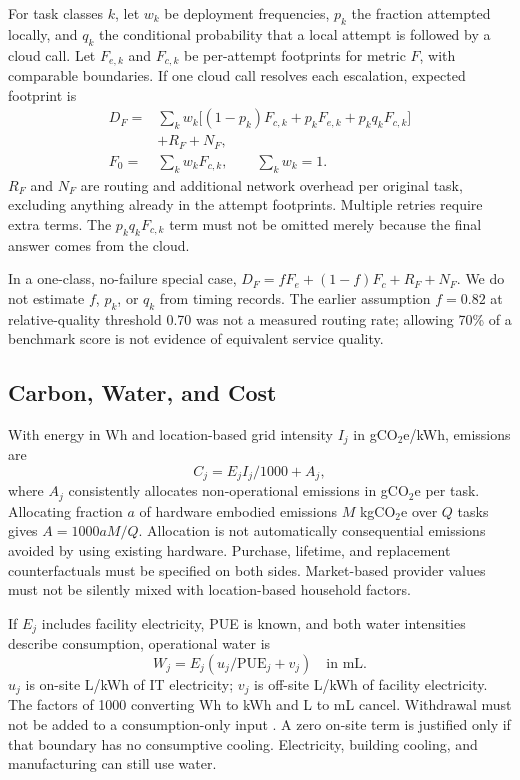 \documentclass[conference]{IEEEtran}
\begin{document}
For task classes $k$, let $w_k$ be deployment frequencies, $p_k$ the
fraction attempted locally, and $q_k$ the conditional probability that a
local attempt is followed by a cloud call. Let $F_{e,k}$ and $F_{c,k}$
be per-attempt footprints for metric $F$, with comparable boundaries.
If one cloud call resolves each escalation, expected footprint is
\begin{align}
D_F={}&\sum_k w_k\big[(1-p_k)F_{c,k}
+p_kF_{e,k}+p_kq_kF_{c,k}\big]\nonumber\\
&+R_F+N_F, \label{eq:routing}\\
F_0={}&\sum_k w_kF_{c,k},\qquad \sum_k w_k=1. \label{eq:baseline}
\end{align}
$R_F$ and $N_F$ are routing and additional network overhead per original
task, excluding anything already in the attempt footprints.
Multiple retries require extra terms. The $p_kq_kF_{c,k}$ term must not
be omitted merely because the final answer comes from the cloud.

In a one-class, no-failure special case,
$D_F=fF_e+(1-f)F_c+R_F+N_F$.
We do not estimate $f$, $p_k$, or $q_k$ from timing records.
The earlier assumption $f=0.82$ at relative-quality threshold 0.70 was
not a measured routing rate; allowing 70\% of a benchmark score is not
evidence of equivalent service quality.

\subsection{Carbon, Water, and Cost}
With energy in Wh and location-based grid intensity $I_j$ in
gCO$_2$e/kWh, emissions are
\begin{equation}
C_j=E_jI_j/1000+A_j, \label{eq:carbon}
\end{equation}
where $A_j$ consistently allocates non-operational emissions in
gCO$_2$e per task. Allocating fraction $a$ of hardware embodied emissions
$M$ kgCO$_2$e over $Q$ tasks gives $A=1000aM/Q$.
Allocation is not automatically consequential emissions avoided by
using existing hardware. Purchase, lifetime, and replacement
counterfactuals must be specified on both sides.
Market-based provider values must not be silently mixed with
location-based household factors.

If $E_j$ includes facility electricity, PUE is known, and both water
intensities describe consumption, operational water is
\begin{equation}
W_j=E_j\left(u_j/\mathrm{PUE}_j+v_j\right)
\quad\text{in mL}. \label{eq:water}
\end{equation}
$u_j$ is on-site L/kWh of IT electricity; $v_j$ is off-site L/kWh of
facility electricity. The factors of 1000 converting Wh to kWh and L to
mL cancel. Withdrawal must not be added to a consumption-only input
\cite{li2025water}. A zero on-site term is justified only if that boundary
has no consumptive cooling. Electricity, building cooling, and
manufacturing can still use water.
\end{document}
